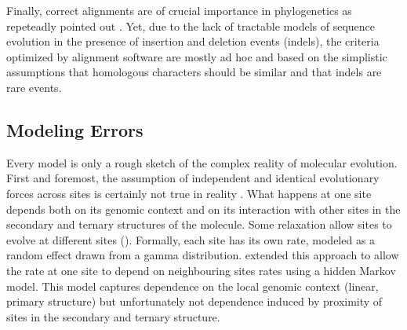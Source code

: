 
Finally, correct alignments are of crucial importance in phylogenetics as repeteadly pointed out \citep{morrison1997effects,ogden2006multiple,talavera2007improvement,wong2008alignment}. Yet, due to the lack of tractable models of sequence evolution in the presence of insertion and deletion events (indels), the criteria optimized by alignment software are mostly ad hoc  and based on the simplistic assumptions that homologous characters should be similar and that indels are rare events.


\subsection{Modeling Errors} \label{sec:modeling-errors}
%
Every model is only a rough sketch of the complex reality of molecular evolution. First and foremost, the assumption of independent and identical evolutionary forces across sites is certainly not true in reality \citep{Bird1986}. What happens at one site depends both on its genomic context and on its interaction with other sites in the secondary and ternary structures of the molecule. Some relaxation allow sites to evolve at different sites (\cite{goldman1994codon}). Formally, each site has its own rate, modeled as a random effect drawn from a gamma distribution. \cite{felsenstein1996hidden} extended this approach to allow the rate at one site to depend on neighbouring sites rates using a hidden Markov model. This model captures dependence on the local genomic context (linear, primary structure) but unfortunately not dependence induced by proximity of sites in the secondary and ternary structure.

